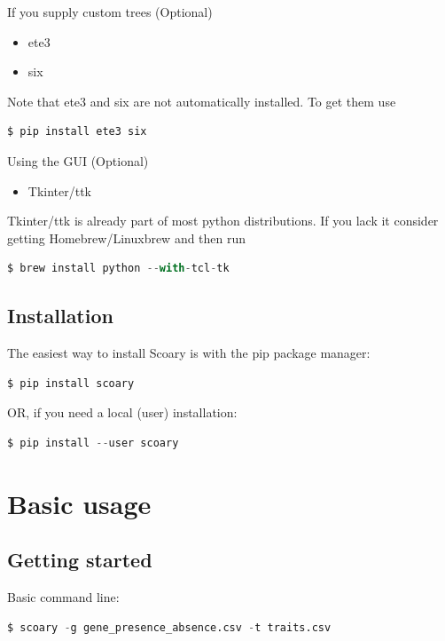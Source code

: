 \documentclass{article}
\begin{document}
    \noindent If you supply custom trees (Optional)

    \begin{itemize}

      \item ete3
      \item six

    \end{itemize}

    \noindent Note that ete3 and six are not automatically installed. To get them use 
    \begin{lstlisting}[language=python, basicstyle=\small]
      $ pip install ete3 six
    \end{lstlisting}

    \noindent Using the GUI (Optional)

    \begin{itemize}

      \item Tkinter/ttk

    \end{itemize}

    \noindent Tkinter/ttk is already part of most python distributions. If you lack it consider getting Homebrew/Linuxbrew and then run
    \begin{lstlisting}[language=python, basicstyle=\small]
      $ brew install python --with-tcl-tk
    \end{lstlisting}

    \subsection{Installation}

    The easiest way to install Scoary is with the pip package manager:
    \begin{lstlisting}[language=python, basicstyle=\small]
      $ pip install scoary
    \end{lstlisting} 
    OR, if you need a local (user) installation:
    \begin{lstlisting}[language=python, basicstyle=\small]
      $ pip install --user scoary
    \end{lstlisting}
  \section{Basic usage}

    \subsection{Getting started}
      Basic command line:
      \begin{lstlisting}[language=python, basicstyle=\small]
        $ scoary -g gene_presence_absence.csv -t traits.csv
      \end{lstlisting}
    
\end{document}
